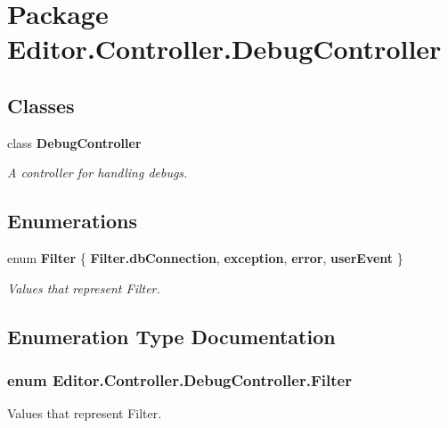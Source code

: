 \section{Package Editor.\-Controller.\-Debug\-Controller}
\label{namespace_editor_1_1_controller_1_1_debug_controller}
\subsection*{Classes}
\begin{DoxyCompactItemize}
\item 
class {\bf Debug\-Controller}
\begin{DoxyCompactList}\small\item\em A controller for handling debugs. \end{DoxyCompactList}\end{DoxyCompactItemize}
\subsection*{Enumerations}
\begin{DoxyCompactItemize}
\item 
enum {\bf Filter} \{ {\bf Filter.\-db\-Connection}, 
{\bfseries exception}, 
{\bfseries error}, 
{\bfseries user\-Event}
 \}
\begin{DoxyCompactList}\small\item\em Values that represent Filter. \end{DoxyCompactList}\end{DoxyCompactItemize}


\subsection{Enumeration Type Documentation}
\subsubsection[{Filter}]{\setlength{\rightskip}{0pt plus 5cm}enum {\bf Editor.\-Controller.\-Debug\-Controller.\-Filter}}\label{namespace_editor_1_1_controller_1_1_debug_controller_a3bb0a25f26e1c734a346719eff9bfcb3}


Values that represent Filter. 

